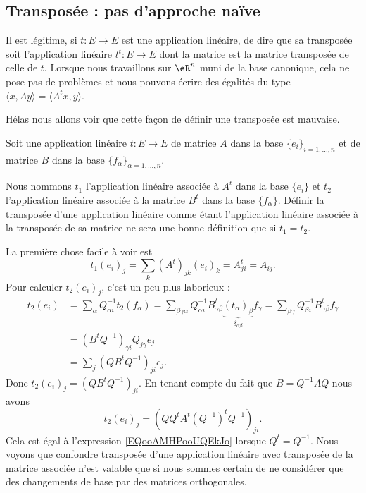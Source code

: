 \subsection{Transposée : pas d'approche naïve}
\label{SUBSECooGPXVooEYwIiJ}

Il est légitime, si \( t\colon E\to E\) est une application linéaire, de dire que sa transposée soit l'application linéaire \( t^t\colon E\to E\) dont la matrice est la matrice transposée de celle de \( t\). Lorsque nous travaillons sur \( \eR^n\) muni de la base canonique, cela ne pose pas de problèmes et nous pouvons écrire des égalités du type \( \langle x, Ay\rangle =\langle A^tx, y\rangle \).

Hélas nous allons voir que cette façon de définir une transposée est mauvaise.

Soit une application linéaire \( t\colon E\to E\) de matrice \( A\) dans la base \( \{ e_i \}_{i=1,\ldots, n}\) et de matrice \( B\) dans la base \( \{ f_{\alpha} \}_{\alpha=1,\ldots, n}\).

Nous nommons \( t_1\) l'application linéaire associée à \( A^t\) dans la base \( \{ e_i \}\) et \( t_2\) l'application linéaire associée à la matrice \( B^t\) dans la base \( \{ f_{\alpha} \}\). Définir la transposée d'une application linéaire comme étant l'application linéaire associée à la transposée de sa matrice ne sera une bonne définition que si \( t_1=t_2\).

La première chose facile à voir est
\begin{equation}        \label{EQooAMHPooUQEkJo}
    t_1(e_i)_j=\sum_k(A^t)_{jk}(e_i)_k=A^t_{ji}=A_{ij}.
\end{equation}
Pour calculer \( t_2(e_i)_j\), c'est un peu plus laborieux :
\begin{subequations}
    \begin{align}
        t_2(e_i)&=\sum_{\alpha}Q_{\alpha i}^{-1} t_2(f_\alpha)=\sum_{\beta\gamma\alpha}Q_{\alpha i}^{-1}B^t_{\gamma\beta}\underbrace{(t_{\alpha})_{\beta}}_{\delta_{\alpha\beta}}f_{\gamma}=\sum_{\beta\gamma}Q_{\beta i}^{-1}B^t_{\gamma\beta}f_{\gamma}\\
        &=(B^tQ^{-1})_{\gamma i}Q_{j\gamma}e_j\\
        &=\sum_j(QB^tQ^{-1})_{ji}e_j.
    \end{align}
\end{subequations}
Donc \( t_2(e_i)_j=(QB^tQ^{-1})_{ji}\). En tenant compte du fait que \( B=Q^{-1}AQ\) nous avons
\begin{equation}
    t_2(e_i)_j=(QQ^tA^t(Q^{-1})^tQ^{-1})_{ji}.
\end{equation}
Cela est égal à l'expression \eqref{EQooAMHPooUQEkJo} lorsque \( Q^t=Q^{-1}\). Nous voyons que confondre transposée d'une application linéaire avec transposée de la matrice associée n'est valable que si nous sommes certain de ne considérer que des changements de base par des matrices orthogonales.

